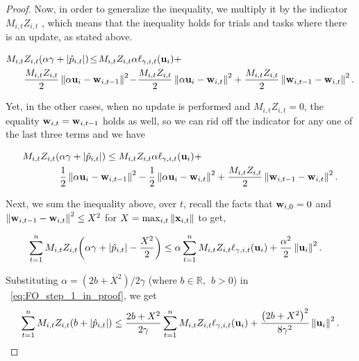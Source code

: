 {\begin{proof}
\noindent
Now, in order to generalize the inequality, we multiply it by the indicator $M_{i,t}Z_{i,t}$ , 
which means that the inequality holds for  trials and tasks where there is an update, as stated above.

\begin{equation}
\begin{split}
M_{i,t}&Z_{i,t}{\left({\alpha\gamma +\left\vert{\hat{p}_{i,t}}\right\vert}\right)} \!\le\! M_{i,t}Z_{i,t}\alpha \ell_{\gamma,i,t}(\mathbf{u}_i)
+\\ &\frac{M_{i,t}Z_{i,t}}{2}\left\Vert {\alpha \mathbf{u}_i-\mathbf{w}_{i,t-1}} \right\Vert^2\!-\!\frac{M_{i,t}Z_{i,t}}{2}\left\Vert {\alpha \mathbf{u}_i-\mathbf{w}_{i,t}} \right\Vert^2+
\frac{M_{i,t}Z_{i,t}}{2}\left\Vert {\mathbf{w}_{i,t-1}-\mathbf{w}_{i,t}} \right\Vert^2.
\end{split}
\label{eq:label}
\end{equation} 

 \noindent
Yet, in the other cases,  when no update is performed and  $M_{i,t}Z_{i,t}=0$,
the equality $\mathbf{w}_{i,t}=\mathbf{w}_{i,t-1}$ holds as well, so we can rid off the indicator for any one of the last three 
terms and we have

\begin{equation*}
\begin{split}
M_{i,t}Z_{i,t}{\left({\alpha\gamma +\left\vert{\hat{p}_{i,t}}\right\vert}\right)} \le M_{i,t}&Z_{i,t}\alpha \ell_{\gamma,i,t}(\mathbf{u}_i)+\\ 
\frac{1}{2}\left\Vert {\alpha \mathbf{u}_i-\mathbf{w}_{i,t-1}} \right\Vert^2&-\frac{1}{2}\left\Vert {\alpha \mathbf{u}_i-\mathbf{w}_{i,t}} \right\Vert^2+
\frac{M_{i,t}Z_{i,t}}{2}\left\Vert {\mathbf{w}_{i,t-1}-\mathbf{w}_{i,t}} \right\Vert^2.
\end{split}
\end{equation*}

\noindent
Next, we sum the inequality above, over $t$,  recall the facts that
$\mathbf{w}_{i,0}=0$ and $\left\Vert {\mathbf{w}_{i,t-1}-\mathbf{w}_{i,t}} \right\Vert^2\le X^2$ for $X=\max_{i,t}\Vert\mathbf{x}_{i,t}\Vert$ to get,

\begin{equation}
\begin{split}
\sum_{t=1}^{n}{M_{i,t}Z_{i,t}{\left({\alpha\gamma+\left\vert{\hat{p}_{i,t}}\right\vert-\frac{X^2}{2}}\right)}}
\le\alpha\sum_{t=1}^{n}{ M_{i,t}Z_{i,t}
  \ell_{\gamma,i,t}(\mathbf{u}_i)}&+\frac{\alpha^2}{2}\left\Vert {\mathbf{u}_i} \right\Vert^2.
\end{split}
\label{eq:FO_step_1_in_proof}
\end{equation}

\noindent
Substituting $\alpha=(2b+X^2)/2\gamma$ (where $b\in\mathbb{R},~~b>0$)
in ~\eqref{eq:FO_step_1_in_proof}, we get
\begin{equation*}
\begin{split}
\sum_{t=1}^{n}{M_{i,t}Z_{i,t}{\left({b +\left\vert{\hat{p}_{i,t}}\right\vert}\right)}}
\le \frac{2b+X^2}{2\gamma}\sum_{t=1}^{n}{ M_{i,t}Z_{i,t}\ell_{\gamma,i,t}(\mathbf{u}_i)}
+\frac{\left({2b+X^2}\right)^2}{8{\gamma}^2}\left\Vert {\mathbf{u}_i} \right\Vert^2.
\end{split}
\end{equation*} 


\end{proof}}
